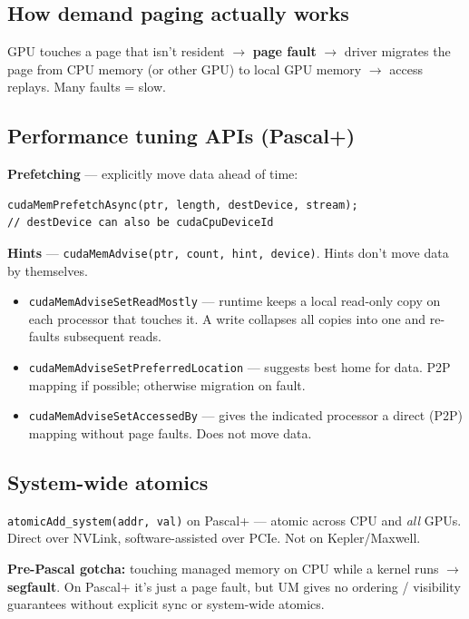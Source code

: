 \documentclass[10pt]{article}
\begin{document}
\subsection*{How demand paging actually works}
GPU touches a page that isn't resident $\rightarrow$ \textbf{page fault} $\rightarrow$ driver migrates the page from CPU memory (or other GPU) to local GPU memory $\rightarrow$ access replays. Many faults = slow.

\subsection*{Performance tuning APIs (Pascal+)}

\textbf{Prefetching} — explicitly move data ahead of time:
\begin{lstlisting}
cudaMemPrefetchAsync(ptr, length, destDevice, stream);
// destDevice can also be cudaCpuDeviceId
\end{lstlisting}

\textbf{Hints} — \texttt{cudaMemAdvise(ptr, count, hint, device)}. Hints don't move data by themselves.
\begin{itemize}
  \item \texttt{cudaMemAdviseSetReadMostly} — runtime keeps a local read-only copy on each processor that touches it. A write collapses all copies into one and re-faults subsequent reads.
  \item \texttt{cudaMemAdviseSetPreferredLocation} — suggests best home for data. P2P mapping if possible; otherwise migration on fault.
  \item \texttt{cudaMemAdviseSetAccessedBy} — gives the indicated processor a direct (P2P) mapping without page faults. Does not move data.
\end{itemize}

\subsection*{System-wide atomics}
\texttt{atomicAdd\_system(addr, val)} on Pascal+ — atomic across CPU and \emph{all} GPUs. Direct over NVLink, software-assisted over PCIe. Not on Kepler/Maxwell.

\begin{gotchabox}
\textbf{Pre-Pascal gotcha:} touching managed memory on CPU while a kernel runs $\rightarrow$ \textbf{segfault}. On Pascal+ it's just a page fault, but UM gives no ordering / visibility guarantees without explicit sync or system-wide atomics.
\end{gotchabox}
\end{document}
